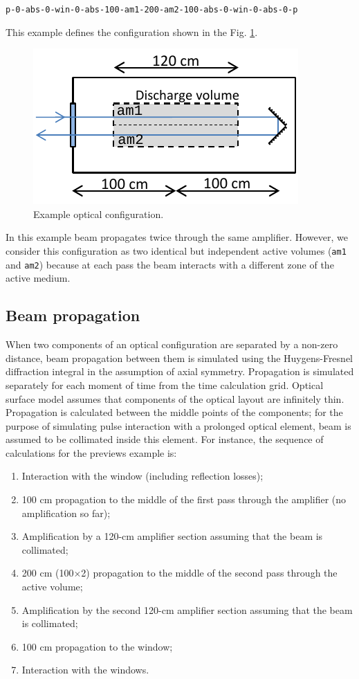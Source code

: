 \documentclass{report}
\begin{document}
\bigskip
\texttt{p-0-abs-0-win-0-abs-100-am1-200-am2-100-abs-0-win-0-abs-0-p }
\bigskip

This example defines the configuration shown in the Fig. \ref{fig:optical-configuration-1}.

\begin{figure}[ht]
\centering
\includegraphics{images/optical-configuration-1}
\caption{Example optical configuration.}\label{fig:optical-configuration-1}
\end{figure}

In this example beam propagates twice through the same amplifier. However, we consider this configuration as two identical but independent active volumes (\texttt{am1} and \texttt{am2}) because at each pass the beam interacts with a different zone of the active medium.

\subsection{Beam propagation}
When two components of an optical configuration are separated by a non-zero distance, beam propagation between them is simulated using the Huygens-Fresnel diffraction integral in the assumption of axial symmetry. Propagation is simulated separately for each moment of time from the time calculation grid.
Optical surface model assumes that components of the optical layout are infinitely thin. Propagation is calculated between the middle points of the components; for the purpose of simulating pulse interaction with a prolonged optical element, beam is assumed to be collimated inside this element. For instance, the sequence of calculations for the previews example is:

\begin{enumerate}
\item Interaction with the window (including reflection losses);
\item 100 cm propagation to the middle of the first pass through the amplifier (no amplification so far);
\item Amplification by a 120-cm amplifier section assuming that the beam is collimated;
\item 200 cm (100$\times$2) propagation to the middle of the second pass through the active volume;
\item Amplification by the second 120-cm amplifier section assuming that the beam is collimated;
\item 100 cm propagation to the window;
\item Interaction with the windows.
\end{enumerate}
\end{document}
